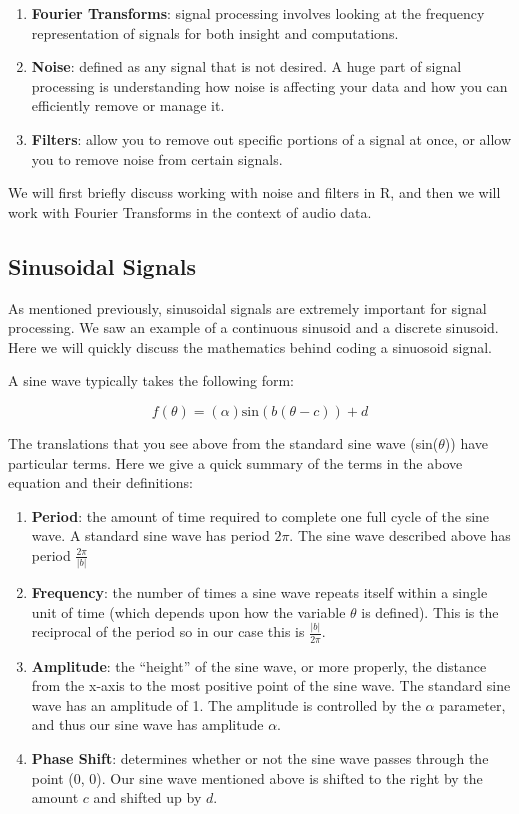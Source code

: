 \documentclass[
]{krantz}
\providecommand{\tightlist}{%
  \setlength{\itemsep}{0pt}\setlength{\parskip}{0pt}}
\begin{document}
\begin{enumerate}
\def\labelenumi{\arabic{enumi}.}
\tightlist
\item
  \textbf{Fourier Transforms}: signal processing involves looking at the frequency representation of signals for both insight and computations.
\item
  \textbf{Noise}: defined as any signal that is not desired. A huge part of signal processing is understanding how noise is affecting your data and how you can efficiently remove or manage it.
\item
  \textbf{Filters}: allow you to remove out specific portions of a signal at once, or allow you to remove noise from certain signals.
\end{enumerate}

We will first briefly discuss working with noise and filters in R, and then we will work with Fourier Transforms in the context of audio data.

\hypertarget{sinusoidal-signals}{%
\subsection{Sinusoidal Signals}\label{sinusoidal-signals}}

As mentioned previously, sinusoidal signals are extremely important for signal processing. We saw an example of a continuous sinusoid and a discrete sinusoid. Here we will quickly discuss the mathematics behind coding a sinuosoid signal.

A sine wave typically takes the following form:

\[
f(\theta) = (\alpha) \text{sin}(b(\theta - c)) + d
\]

The translations that you see above from the standard sine wave (sin(\(\theta\))) have particular terms. Here we give a quick summary of the terms in the above equation and their definitions:

\begin{enumerate}
\def\labelenumi{\arabic{enumi}.}
\tightlist
\item
  \textbf{Period}: the amount of time required to complete one full cycle of the sine wave. A standard sine wave has period \(2\pi\). The sine wave described above has period \(\frac{2\pi}{|b|}\)
\item
  \textbf{Frequency}: the number of times a sine wave repeats itself within a single unit of time (which depends upon how the variable \(\theta\) is defined). This is the reciprocal of the period so in our case this is \(\frac{|b|}{2\pi}\).
\item
  \textbf{Amplitude}: the ``height'' of the sine wave, or more properly, the distance from the x-axis to the most positive point of the sine wave. The standard sine wave has an amplitude of 1. The amplitude is controlled by the \(\alpha\) parameter, and thus our sine wave has amplitude \(\alpha\).
\item
  \textbf{Phase Shift}: determines whether or not the sine wave passes through the point (0, 0). Our sine wave mentioned above is shifted to the right by the amount \(c\) and shifted up by \(d\).
\end{enumerate}
\end{document}
